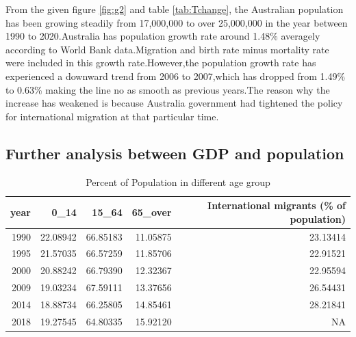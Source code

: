 \documentclass[11pt,a4paper,]{article}
\begin{document}
From the given figure \ref{fig:g2} and table \ref{tab:Tchange}, the Australian population has been growing steadily from 17,000,000 to over 25,000,000 in the year between 1990 to 2020.Australia has population growth rate around 1.48\% averagely according to World Bank data.Migration and birth rate minus mortality rate were included in this growth rate.However,the population growth rate has experienced a downward trend from 2006 to 2007,which has dropped from 1.49\% to 0.63\% making the line no as smooth as previous years.The reason why the increase has weakened is because Australia government had tightened the policy for international migration at that particular time.

\subsection{Further analysis between GDP and population}

\begin{table}[H]

\caption{\label{tab:Achange}Percent of Population in different age group}
\centering
\begin{tabular}[t]{r|r|r|r|r}
\hline
year & 0\_14 & 15\_64 & 65\_over & International migrants (\% of population)\\
\hline
1990 & 22.08942 & 66.85183 & 11.05875 & 23.13414\\
\hline
1995 & 21.57035 & 66.57259 & 11.85706 & 22.91521\\
\hline
2000 & 20.88242 & 66.79390 & 12.32367 & 22.95594\\
\hline
2009 & 19.03234 & 67.59111 & 13.37656 & 26.54431\\
\hline
2014 & 18.88734 & 66.25805 & 14.85461 & 28.21841\\
\hline
2018 & 19.27545 & 64.80335 & 15.92120 & NA\\
\hline
\end{tabular}
\end{table}
\end{document}
